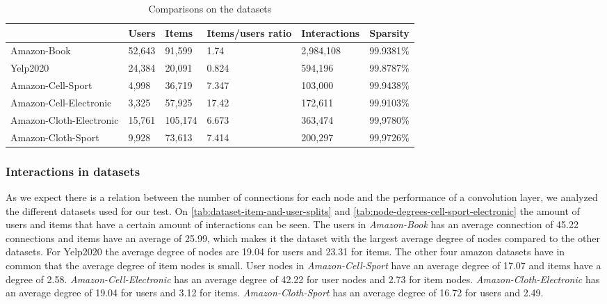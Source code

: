\begin{table*}[]
    \centering
    \begin{tabular}{|l|l|l|l|l|l|}
        \hline
                                & Users  & Items   & Items/users ratio & Interactions & Sparsity  \\ \hline
        Amazon-Book             & 52,643 & 91,599  & 1.74              & 2,984,108    & 99.9381\% \\ \hline
        Yelp2020                & 24,384 & 20,091  & 0.824             & 594,196      & 99.8787\% \\ \hline
        Amazon-Cell-Sport       & 4,998  & 36,719  & 7.347             & 103,000      & 99.9438\% \\ \hline
        Amazon-Cell-Electronic  & 3,325  & 57,925  & 17.42             & 172,611      & 99.9103\% \\ \hline
        Amazon-Cloth-Electronic & 15,761 & 105,174 & 6.673             & 363,474      & 99,9780\% \\ \hline
        Amazon-Cloth-Sport      & 9,928  & 73,613  & 7.414             & 200,297      & 99,9726\% \\ \hline
    \end{tabular}
    \caption{Comparisons on the datasets}
    \label{tab:dataset-comparison}
\end{table*}

\subsubsection{Interactions in datasets}
As we expect there is a relation between the number of connections for each node and the performance of a convolution layer, we analyzed the different datasets used for our test.
On \autoref{tab:dataset-item-and-user-splits} and \autoref{tab:node-degrees-cell-sport-electronic} the amount of users and items that have a certain amount of interactions can be seen.
The users in \textit{Amazon-Book} has an average connection of 45.22 connections and items have an average of 25.99, which makes it the dataset with the largest average degree of nodes compared to the other datasets.
For Yelp2020 the average degree of nodes are 19.04 for users and 23.31 for items.
The other four amazon datasets have in common that the average degree of item nodes is small.
User nodes in \textit{Amazon-Cell-Sport} have an average degree of 17.07 and items have a degree of 2.58.
\textit{Amazon-Cell-Electronic} has an average degree of 42.22 for user nodes and 2.73 for item nodes.
\textit{Amazon-Cloth-Electronic} has an average degree of 19.04 for users and 3.12 for items.
\textit{Amazon-Cloth-Sport} has an average degree of 16.72 for users and 2.49.

